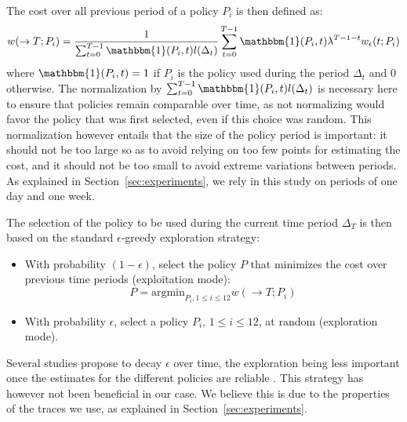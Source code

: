 \documentclass[sigconf,review,anonymous]{acmart}
\begin{document}

The cost over all previous period of a policy $P_i$ is then defined as:
%
\begin{equation} \label{eq:tot-cost-greedy} w(\rightarrow T;P_i) =
\frac{1}{\sum_{t=0}^{T-1} \mathbbm{1}(P_i,t) l(\Delta_t)} \sum_{t=0}^{T-1}
\mathbbm{1}(P_i,t) \lambda^{T-1-t} w_{\epsilon}(t;P_i) \end{equation}
%
where $\mathbbm{1}(P_i,t) = 1$ if $P_i$ is the policy used during the period
$\Delta_t$ and $0$ otherwise. The normalization by $\sum_{t=0}^{T-1}
\mathbbm{1}(P_i,t) l(\Delta_t)$ is necessary here to ensure that policies
remain comparable over time, as not normalizing would favor the policy that was
first selected, even if this choice was random. This normalization however
entails that the size of the policy period is important: it should not be too
large so as to avoid relying on too few points for estimating the cost, and it
should not be too small to avoid extreme variations between periods. As
explained in Section~\ref{sec:experiments}, we rely in this study on periods of
one day and one week.

The selection of the policy to be used during the current time period
$\Delta_T$ is then based on the standard $\epsilon$-greedy exploration
strategy:

%
\begin{itemize}
\item With probability $(1-\epsilon)$, select the policy $P$ that minimizes the cost over previous time periods (exploitation mode):
%
\begin{equation}
\label{eq:select-greedy}
P = \mbox{argmin}_{P_i, 1 \le i \le 12} w(\rightarrow T;P_i)
\end{equation}
%
\item With probability $\epsilon$, select a policy $P_i, \, 1 \le i \le 12$, at random (exploration mode).
\end{itemize}

Several studies propose to decay $\epsilon$ over time, the exploration being
less important once the estimates for the different policies are reliable
\cite{Tokic:2010}. This strategy has however not been beneficial in our case.
We believe this is due to the properties of the traces we use, as
explained in Section~\ref{sec:experiments}.
\end{document}
